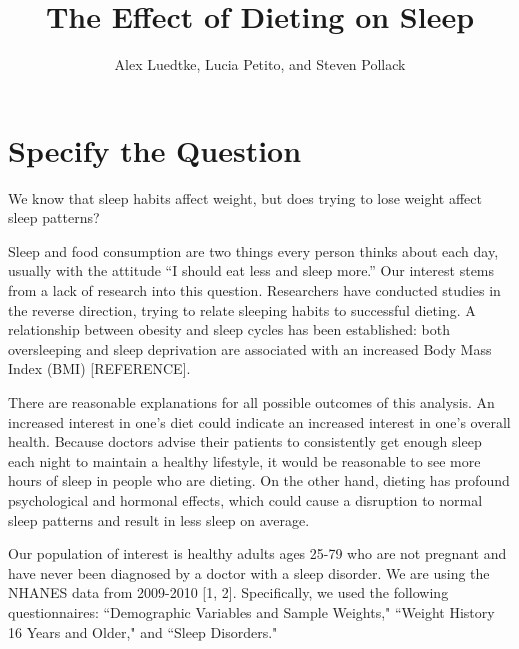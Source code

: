 \documentclass{article}
\begin{document}




\title{\textbf{The Effect of Dieting on Sleep}}
\author{Alex Luedtke, Lucia Petito, and Steven Pollack}
\date{}
\maketitle

\section{Specify the Question}

We know that sleep habits affect weight, but does trying to lose weight affect sleep patterns?

Sleep and food consumption are two things every person thinks about each day, usually with the attitude ``I should eat less and sleep more.''  Our interest stems from a lack of research into this question.  Researchers have conducted studies in the reverse direction, trying to relate sleeping habits to successful dieting.  A relationship between obesity and sleep cycles has been established: both oversleeping and sleep deprivation are associated with an increased Body Mass Index (BMI) [REFERENCE].  

There are reasonable explanations for all possible outcomes of this analysis.  An increased interest in one's diet could indicate an increased interest in one's overall health.  Because doctors advise their patients to consistently get enough sleep each night to maintain a healthy lifestyle, it would be reasonable to see more hours of sleep in people who are dieting.  On the other hand, dieting has profound psychological and hormonal effects, which could cause a disruption to normal sleep patterns and result in less sleep on average.


Our population of interest is healthy adults ages 25-79 who are not pregnant and have never been diagnosed by a doctor with a sleep disorder.  We are using the NHANES data from 2009-2010 [1, 2].  Specifically, we used the following questionnaires: ``Demographic Variables and Sample Weights," ``Weight History 16 Years and Older," and ``Sleep Disorders."
\end{document}
